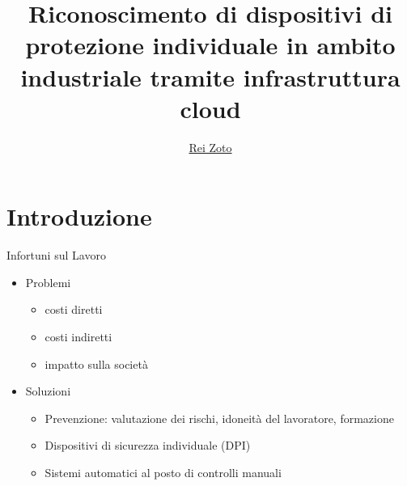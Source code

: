 \documentclass{beamer}
\title{Riconoscimento di dispositivi di
protezione individuale in ambito
industriale tramite infrastruttura
cloud}
\author{\href{mailto:rei.zoto@studenti.polito.it}{Rei Zoto}}
\begin{document}
\maketitle

\section{Introduzione}

\begin{frame}{Infortuni sul Lavoro}
\begin{itemize}
    \item Problemi
    	\begin{itemize}
    		\item costi diretti
    		\item costi indiretti
    		\item impatto sulla società
    	\end{itemize}	
    \item Soluzioni
    \begin{itemize}
    	\item Prevenzione: valutazione dei rischi, idoneità del lavoratore, formazione
    	\item Dispositivi di sicurezza individuale (DPI)
    	\item Sistemi automatici al posto di controlli manuali
    \end{itemize}
\end{itemize}
\end{frame}
\end{document}
